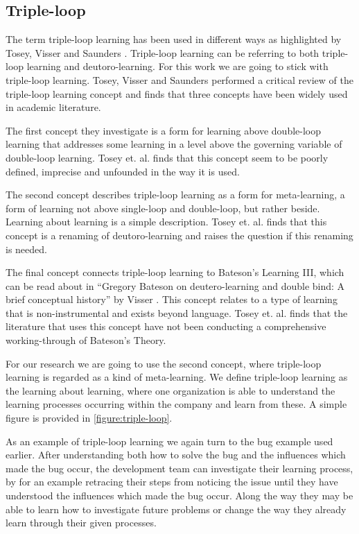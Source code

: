 \subsection{Triple-loop} %
\label{sub:triplloop}
The term triple-loop learning has been used in different ways as highlighted by Tosey, Visser and Saunders \cite{Tosey2011}. Triple-loop learning can be referring to both triple-loop learning and deutoro-learning. For this work we are going to stick with triple-loop learning. Tosey, Visser and Saunders performed a critical review of the triple-loop learning concept and finds that three concepts have been widely used in academic literature. 

The first concept they investigate is a form for learning above double-loop learning that addresses some learning in a level above the governing variable of double-loop learning. Tosey et. al. finds that this concept seem to be poorly defined, imprecise and unfounded in the way it is used. 

The second concept describes triple-loop learning as a form for meta-learning, a form of learning not above single-loop and double-loop, but rather beside. Learning about learning is a simple description. Tosey et. al. finds that this concept is a renaming of deutoro-learning and raises the question if this renaming is needed. 

The final concept connects triple-loop learning to Bateson's Learning III, which can be read about in ``Gregory Bateson on deutero-learning and double bind: A brief conceptual history'' by Visser \cite{Visser2003}. This concept relates to a type of learning that is non-instrumental and exists beyond language. Tosey et. al. finds that the literature that uses this concept have not been conducting a comprehensive working-through of Bateson's Theory. 

For our research we are going to use the second concept, where triple-loop learning is regarded as a kind of meta-learning. We define triple-loop learning as the learning about learning, where one organization is able to understand the learning processes occurring within the company and learn from these. A simple figure is provided in \autoref{figure:triple-loop}.

As an example of triple-loop learning we again turn to the bug example used earlier. After understanding both how to solve the bug and the influences which made the bug occur, the development team can investigate their learning process, by for an example retracing their steps from noticing the issue until they have understood the influences which made the bug occur. Along the way they may be able to learn how to investigate future problems or change the way they already learn through their given processes. 

